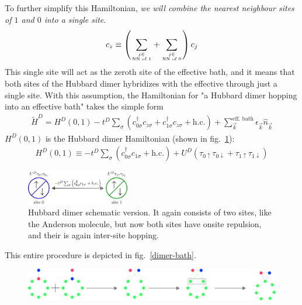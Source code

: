 \documentclass{report}
\numberwithin{equation}{section}
\begin{document}
{ To further simplify this Hamiltonian, \textit{we will combine the nearest neighbour sites of \(1\) and \(0\) into a single site}.
 \begin{equation}\begin{aligned}
 	c_z \equiv \left(\sum_{j \in \atop{\text{NN of 1}}} + \sum_{j \in \atop{\text{NN of 0}}}\right)c_{j}
 \end{aligned}\end{equation}
 This single site will act as the zeroth site of the effective bath, and it means that both sites of the Hubbard dimer hybridizes with the effective through just a single site. With this assumption, the Hamiltonian for "a Hubbard dimer hopping into an effective bath" takes the simple form
 \begin{equation}\begin{aligned}
 	\label{dimer_p_bat}
 	\tilde H^D = H^D(0,1) - t^D \sum_{\sigma}\left(c^\dagger_{0\sigma}c_{z\sigma} + c^\dagger_{1\sigma}c_{z\sigma} + \text{h.c.}\right) + \sum_{\vec k}^\text{eff. bath}\epsilon_{\vec k}\hat n_{\vec k}
 \end{aligned}\end{equation}
 \(H^D(0,1)\) is the Hubbard dimer Hamiltonian (shown in fig.~\ref{hubb-dim}):
 \begin{equation}\begin{aligned}
 	\label{dimer_ham}
 	H^D(0,1) \equiv -t^D\sum_\sigma\left( c^\dagger_{0\sigma}c_{1\sigma} + \text{h.c.} \right) + U^D\left( \tau_{0 \uparrow}\tau_{0 \downarrow} + \tau_{1 \uparrow}\tau_{1 \downarrow}\right)
 \end{aligned}\end{equation}
 \begin{figure}[!htb]
 	\centering
 	\includegraphics[width=0.4\textwidth]{../figures/hubb_dim.png}
 	\caption{Hubbard dimer schematic version. It again consists of two sites, like the Anderson molecule, but now both sites have onsite repulsion, and their is again inter-site hopping.}
 	\label{hubb-dim}
 \end{figure}
 This entire procedure is depicted in fig.~\ref{dimer-bath}.
 \begin{figure}[!htb]
 	\centering
 	\includegraphics[width=\textwidth]{../figures/dimer_bath.pdf}

\end{figure}}
\end{document}
